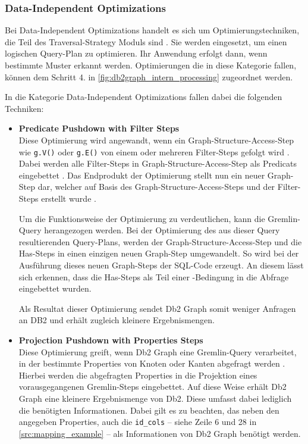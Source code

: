 \subsubsection{Data-Independent Optimizations}
\label{subsubsec:data_independent_optimizations}
Bei Data-Independent Optimizations handelt es sich um Optimierungstechniken, die Teil des Traversal-Strategy Moduls sind \cite{sigmod_tian}. Sie werden eingesetzt, um einen logischen Query-Plan zu optimieren. Ihr Anwendung erfolgt dann, wenn bestimmte Muster erkannt werden. Optimierungen die in diese Kategorie fallen, können dem Schritt 4. in \autoref{fig:db2graph_intern_processing} zugeordnet werden. 

In die Kategorie Data-Independent Optimizations fallen dabei die folgenden Techniken: 

\begin{itemize}
    \item \textbf{Predicate Pushdown with Filter Steps}\\
    Diese Optimierung wird angewandt, wenn ein Graph-Structure-Access-Step wie \texttt{g.V()} oder \texttt{g.E()} von einem oder mehreren Filter-Steps gefolgt wird \cite{sigmod_tian}. Dabei werden alle Filter-Steps in Graph-Structure-Access-Step als Predicats eingebettet \cite{sigmod_tian}. Das Endprodukt der Optimierung stellt nun ein neuer Graph-Step dar, welcher auf Basis des Graph-Structure-Access-Steps und der Filter-Steps erstellt wurde \cite{sigmod_tian}. 
    
    Um die Funktionsweise der Optimierung zu verdeutlichen, kann die Gremlin-Query  herangezogen werden. Bei der Optimierung des aus dieser Query resultierenden Query-Plans, werden der Graph-Structure-Access-Step und die Has-Steps in einen einzigen neuen Graph-Step umgewandelt. So wird bei der Ausführung dieses neuen Graph-Steps der SQL-Code  erzeugt. An diesem lässt sich erkennen, dass die Has-Steps als Teil einer -Bedingung in die Abfrage eingebettet wurden.

    Als Resultat dieser Optimierung sendet Db2 Graph somit weniger Anfragen an DB2 und erhält zugleich kleinere Ergebnismengen.

    \item \textbf{Projection Pushdown with Properties Steps}\\
    Diese Optimierung greift, wenn Db2 Graph eine Gremlin-Query verarbeitet, in der bestimmte Properties von Knoten oder Kanten abgefragt werden \cite{sigmod_tian}. Hierbei werden die abgefragten Properties in die Projektion eines vorausgegangenen Gremlin-Steps eingebettet. Auf diese Weise erhält Db2 Graph eine kleinere Ergebnismenge von Db2. Diese umfasst dabei lediglich die benötigten Informationen. Dabei gilt es zu beachten, das neben den angegeben Properties, auch die \texttt{id\_cols} -- siehe Zeile 6 und 28 in \autoref{src:mapping_example} -- als Informationen von Db2 Graph benötigt werden. 


\end{itemize}
